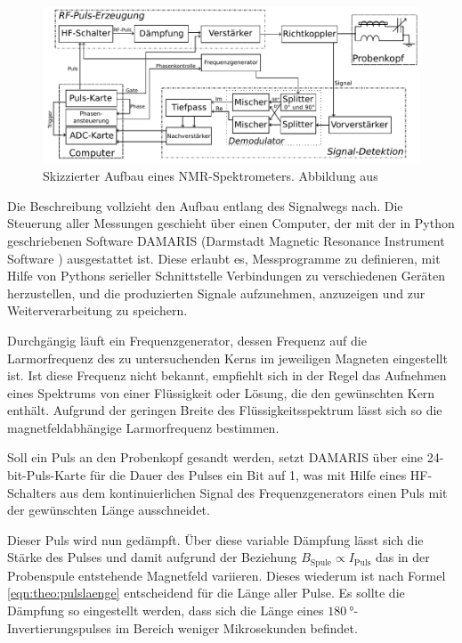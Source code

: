 \begin{figure}
	\begin{center}
		\includegraphics[width=\textwidth]{graphics/joachim/aufbau.pdf} 
	\end{center}
	\caption{Skizzierter Aufbau eines NMR-Spektrometers. Abbildung aus \cite[S. 29]{lueg_implementierung_2016}} \label{fig:exp:aufbau}
\end{figure}

Die Beschreibung vollzieht den Aufbau entlang des Signalwegs nach. Die Steuerung aller Messungen geschieht über einen Computer, der mit der in Python geschriebenen Software DAMARIS (Darmstadt Magnetic Resonance Instrument Software \cite{gadke_damaris_2007}) ausgestattet ist. Diese erlaubt es, Messprogramme zu definieren, mit Hilfe von Pythons serieller Schnittstelle Verbindungen zu verschiedenen Geräten herzustellen, und die produzierten Signale aufzunehmen, anzuzeigen und zur Weiterverarbeitung zu speichern.

Durchgängig läuft ein Frequenzgenerator, dessen Frequenz auf die Larmorfrequenz des zu untersuchenden Kerns im jeweiligen Magneten eingestellt ist. Ist diese Frequenz nicht bekannt, empfiehlt sich in der Regel das Aufnehmen eines Spektrums von einer Flüssigkeit oder Lösung, die den gewünschten Kern enthält. Aufgrund der geringen Breite des Flüssigkeitsspektrum lässt sich so die magnetfeldabhängige Larmorfrequenz bestimmen.

Soll ein Puls an den Probenkopf gesandt werden, setzt DAMARIS über eine 24-bit-Puls-Karte für die Dauer des Pulses ein Bit auf 1, was mit Hilfe eines HF-Schalters aus dem kontinuierlichen Signal des Frequenzgenerators einen Puls mit der gewünschten Länge ausschneidet.

Dieser Puls wird nun gedämpft. Über diese variable Dämpfung lässt sich die Stärke des Pulses und damit aufgrund der Beziehung $B_\text{Spule} \propto I_\text{Puls}$ das in der Probenspule entstehende Magnetfeld variieren. Dieses wiederum ist nach Formel \eqref{eqn:theo:pulslaenge} entscheidend für die Länge aller Pulse. Es sollte die Dämpfung so eingestellt werden, dass sich die Länge eines $\SI{180}{\degree}$-Invertierungspulses im Bereich weniger Mikrosekunden befindet.

